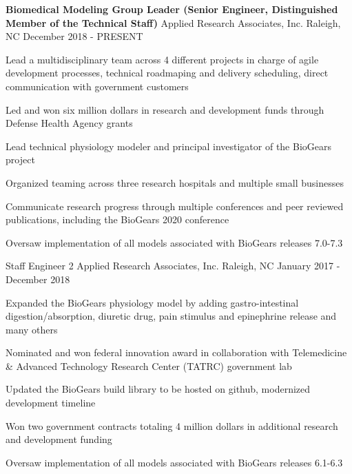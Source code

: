 
\begin{cventries}
  \cventry
    {\textbf{Biomedical Modeling Group Leader (Senior Engineer, Distinguished Member of the Technical Staff)}} %
    {Applied Research Associates, Inc.} %
    {Raleigh, NC} %
    {December 2018 - PRESENT} %
    {
      \begin{cvitems} %
        \item {Lead a multidisciplinary team across 4 different projects in charge of agile development processes, technical roadmaping and delivery scheduling, direct communication with government customers}
        \item {Led and won six million dollars in research and development funds through Defense Health Agency grants}
        \item {Lead technical physiology modeler and principal investigator of the BioGears project}
        \item {Organized teaming across three research hospitals and multiple small businesses}
        \item {Communicate research progress through multiple conferences and peer reviewed publications, including the BioGears 2020 conference}
        \item {Oversaw implementation of all models associated with BioGears releases 7.0-7.3}
      \end{cvitems}
    }

  \cventry
    {\color{awesome-nephritis}Staff Engineer 2} %
    {Applied Research Associates, Inc.} %
    {Raleigh, NC} %
    {January 2017 - December 2018} %
    {
      \begin{cvitems} %
        \item {Expanded the BioGears physiology model by adding gastro-intestinal digestion/absorption, diuretic drug, pain stimulus and epinephrine release and many others}
        \item {Nominated and won federal innovation award in collaboration with Telemedicine \& Advanced Technology Research Center (TATRC) government lab}
        \item {Updated the BioGears build library to be hosted on github, modernized development timeline}
        \item {Won two government contracts totaling 4 million dollars in additional research and development funding}
        \item {Oversaw implementation of all models associated with BioGears releases 6.1-6.3}
      \end{cvitems}
    }


\end{cventries}
